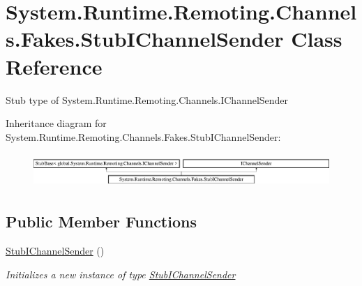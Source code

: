 \hypertarget{class_system_1_1_runtime_1_1_remoting_1_1_channels_1_1_fakes_1_1_stub_i_channel_sender}{\section{System.\-Runtime.\-Remoting.\-Channels.\-Fakes.\-Stub\-I\-Channel\-Sender Class Reference}
\label{class_system_1_1_runtime_1_1_remoting_1_1_channels_1_1_fakes_1_1_stub_i_channel_sender}
}


Stub type of System.\-Runtime.\-Remoting.\-Channels.\-I\-Channel\-Sender 


Inheritance diagram for System.\-Runtime.\-Remoting.\-Channels.\-Fakes.\-Stub\-I\-Channel\-Sender\-:\begin{figure}[H]
\begin{center}
\leavevmode
\includegraphics[height=1.302326cm]{class_system_1_1_runtime_1_1_remoting_1_1_channels_1_1_fakes_1_1_stub_i_channel_sender}
\end{center}
\end{figure}
\subsection*{Public Member Functions}
\begin{DoxyCompactItemize}
\item 
\hyperlink{class_system_1_1_runtime_1_1_remoting_1_1_channels_1_1_fakes_1_1_stub_i_channel_sender_ac3e4bccbc228de50fc87cce3905648a9}{Stub\-I\-Channel\-Sender} ()
\begin{DoxyCompactList}\small\item\em Initializes a new instance of type \hyperlink{class_system_1_1_runtime_1_1_remoting_1_1_channels_1_1_fakes_1_1_stub_i_channel_sender}{Stub\-I\-Channel\-Sender}\end{DoxyCompactList}\end{DoxyCompactItemize}
